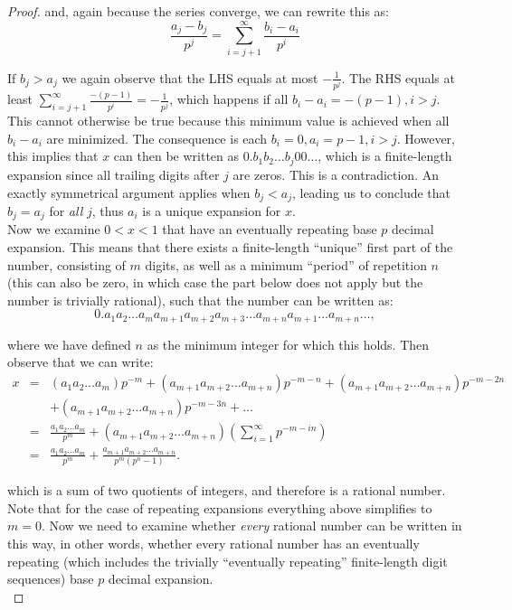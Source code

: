 \begin{proof}
    and, again because the series converge, we can rewrite this as:
    $$\frac{a_j - b_j}{p^j} = \sum_{i=j+1}^{\infty}\frac{b_i - a_i}{p^i}$$

    If $b_j > a_j$ we again observe that the LHS equals at most $-\frac{1}{p^j}$. The RHS equals at least $\sum_{i=j+1}^{\infty}\frac{-(p-1)}{p^i} = -\frac{1}{p^j}$, which happens if all $b_i - a_i = -(p-1), i > j$. This cannot otherwise be true because this minimum value is achieved when all $b_i - a_i$ are minimized. The consequence is each $b_i = 0, a_i = p - 1, i > j$. However, this implies that $x$ can then be written as $0.b_1 b_2 \ldots b_j 0 0 \ldots$, which is a finite-length expansion since all trailing digits after $j$ are zeros. This is a contradiction. An exactly symmetrical argument applies when $b_j < a_j$, leading us to conclude that $b_j = a_j$ for \textit{all} $j$, thus $a_i$ is a unique expansion for $x$.\\

    Now we examine $0 < x < 1$ that have an eventually repeating base $p$ decimal expansion. This means that there exists a finite-length ``unique'' first part of the number, consisting of $m$ digits, as well as a minimum ``period'' of repetition $n$ (this can also be zero, in which case the part below does not apply but the number is trivially rational), such that the number can be written as:
    $$0.a_1 a_2 \ldots a_m a_{m+1} a_{m+2} a_{m+3} \ldots a_{m+n} a_{m+1} \ldots a_{m+n} \ldots,$$

    where we have defined $n$ as the minimum integer for which this holds. Then observe that we can write:
    \begin{eqnarray*}
        x
        & = & (a_1 a_2 \ldots a_m)p^{-m} + (a_{m+1} a_{m+2}\ldots a_{m+n})p^{-m-n} + (a_{m+1} a_{m+2}\ldots a_{m+n})p^{-m-2n}\\
        & & + (a_{m+1} a_{m+2} \ldots a_{m+n})p^{-m-3n} + \ldots\\
        & = & \frac{a_1 a_2 \ldots a_m}{p^m} + (a_{m+1} a_{m+2} \ldots a_{m+n})(\sum_{i=1}^{\infty} p^{-m-in})\\
        & = & \frac{a_1 a_2 \ldots a_m}{p^m} + \frac{a_{m+1} a_{m+2} \ldots a_{m+n}}{p^{m}(p^n - 1)}.
    \end{eqnarray*}

    which is a sum of two quotients of integers, and therefore is a rational number. Note that for the case of repeating expansions everything above simplifies to $m=0$. Now we need to examine whether \textit{every} rational number can be written in this way, in other words, whether every rational number has an eventually repeating (which includes the trivially ``eventually repeating'' finite-length digit sequences) base $p$ decimal expansion.\\


\end{proof}
